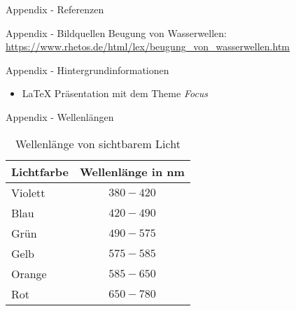 \appendix

\begin{frame}{Appendix - Referenzen}
    \nocite{*} %
    
    
\end{frame}

\begin{frame}{Appendix - Bildquellen}
    Beugung von Wasserwellen: \\
    \url{https://www.rhetos.de/html/lex/beugung_von_wasserwellen.htm}
\end{frame}

\begin{frame}{Appendix - Hintergrundinformationen}
    \begin{itemize}
        \item \LaTeX{} Präsentation mit dem Theme \emph{Focus}
    \end{itemize}

\end{frame}

\begin{frame}{Appendix - Wellenlängen}
    \begin{table}
        \centering %
        \begin{tabular}{l c}
            \toprule
            Lichtfarbe & Wellenlänge in nm \\
            \toprule
            Violett    & $380 - 420$       \\
            Blau       & $420 - 490$       \\
            Grün       & $490 - 575$       \\
            Gelb       & $575 - 585$       \\
            Orange     & $585 - 650$       \\
            Rot        & $650 - 780$       \\
            \bottomrule
        \end{tabular}
        \caption{Wellenlänge von sichtbarem Licht}
    \end{table}
\end{frame}
